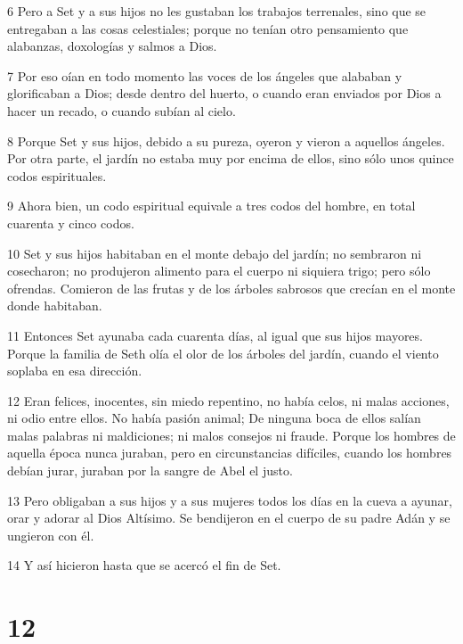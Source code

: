 \par 6 Pero a Set y a sus hijos no les gustaban los trabajos terrenales, sino que se entregaban a las cosas celestiales; porque no tenían otro pensamiento que alabanzas, doxologías y salmos a Dios.

\par 7 Por eso oían en todo momento las voces de los ángeles que alababan y glorificaban a Dios; desde dentro del huerto, o cuando eran enviados por Dios a hacer un recado, o cuando subían al cielo.

\par 8 Porque Set y sus hijos, debido a su pureza, oyeron y vieron a aquellos ángeles. Por otra parte, el jardín no estaba muy por encima de ellos, sino sólo unos quince codos espirituales.

\par 9 Ahora bien, un codo espiritual equivale a tres codos del hombre, en total cuarenta y cinco codos.

\par 10 Set y sus hijos habitaban en el monte debajo del jardín; no sembraron ni cosecharon; no produjeron alimento para el cuerpo ni siquiera trigo; pero sólo ofrendas. Comieron de las frutas y de los árboles sabrosos que crecían en el monte donde habitaban.

\par 11 Entonces Set ayunaba cada cuarenta días, al igual que sus hijos mayores. Porque la familia de Seth olía el olor de los árboles del jardín, cuando el viento soplaba en esa dirección.

\par 12 Eran felices, inocentes, sin miedo repentino, no había celos, ni malas acciones, ni odio entre ellos. No había pasión animal; De ninguna boca de ellos salían malas palabras ni maldiciones; ni malos consejos ni fraude. Porque los hombres de aquella época nunca juraban, pero en circunstancias difíciles, cuando los hombres debían jurar, juraban por la sangre de Abel el justo.

\par 13 Pero obligaban a sus hijos y a sus mujeres todos los días en la cueva a ayunar, orar y adorar al Dios Altísimo. Se bendijeron en el cuerpo de su padre Adán y se ungieron con él.

\par 14 Y así hicieron hasta que se acercó el fin de Set.

\chapter{12}

